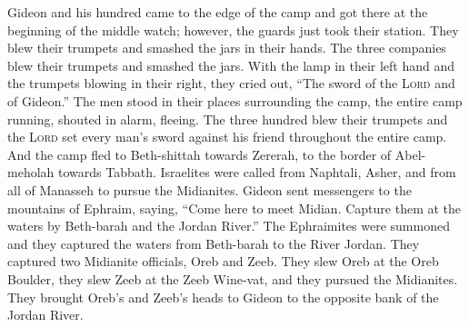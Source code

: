\begin{inparaenum}
     Gideon and his hundred came to the edge of the camp and got there at the beginning of the middle watch; however, the guards just took their station. They blew their trumpets and smashed the jars in their hands.%
     The three companies blew their trumpets and smashed the jars. With the lamp in their left hand and the trumpets blowing in their right, they cried out, ``The sword of the \textsc{Lord} and of Gideon.''%
     The men stood in their places surrounding the camp, the entire camp running, shouted in alarm, fleeing.%
     The three hundred blew their trumpets and the \textsc{Lord} set every man's sword against his friend throughout the entire camp. And the camp fled to Beth-shittah towards Zererah, to the border of Abel-meholah towards Tabbath.%
     Israelites were called from Naphtali, Asher, and from all of Manasseh to pursue the Midianites.%
     Gideon sent messengers to the mountains of Ephraim, saying, ``Come here to meet Midian. Capture them at the waters by Beth-barah and the Jordan River.'' The Ephraimites were summoned and they captured the waters from Beth-barah to the River Jordan.%
     They captured two Midianite officials, Oreb and Zeeb. They slew Oreb at the Oreb Boulder, they slew Zeeb at the Zeeb Wine-vat, and they pursued the Midianites. They brought Oreb's and Zeeb's heads to Gideon to the opposite bank of the Jordan River.%
\end{inparaenum}
